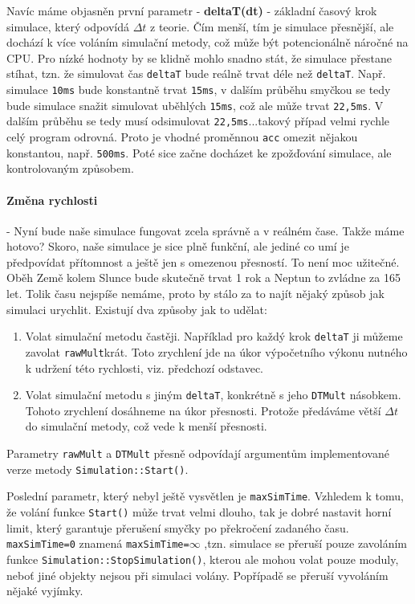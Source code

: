 \label{par:spiral}
Navíc máme objasněn první parametr - \textbf{deltaT(dt)} - základní časový krok simulace, který odpovídá $ \Delta t $ z teorie. Čím menší, tím je simulace přesnější, ale dochází k více voláním simulační metody, což může být potencionálně náročné na CPU.
Pro nízké hodnoty by se klidně mohlo snadno stát, že simulace přestane stíhat, tzn. že simulovat čas \texttt{deltaT} bude reálně trvat déle než \texttt{deltaT}. Např.
simulace \texttt{10ms} bude konstantně trvat \texttt{15ms}, v dalším průběhu smyčkou se tedy bude simulace snažit simulovat uběhlých \texttt{15ms}, což ale může trvat \texttt{22,5ms}. V dalším průběhu se tedy musí odsimulovat \texttt{22,5ms}...takový případ velmi rychle celý program odrovná. Proto je vhodné proměnnou \texttt{acc} omezit nějakou konstantou, např. \texttt{500ms}. Poté sice začne docházet ke zpožďování simulace, ale kontrolovaným způsobem.
\paragraph{Změna rychlosti} - Nyní bude naše simulace fungovat zcela správně a v reálném čase. Takže máme hotovo? Skoro, naše simulace je sice plně funkční, ale jediné co umí je předpovídat přítomnost a ještě jen s omezenou přesností. To není moc užitečné. Oběh Země kolem Slunce bude skutečně trvat 1 rok a Neptun to zvládne za 165 let. Tolik času nejspíše nemáme, proto by stálo za to najít nějaký způsob jak simulaci urychlit. Existují dva způsoby jak to udělat:
\begin{enumerate}
	\item Volat simulační metodu častěji. Například pro každý krok \texttt{deltaT} ji můžeme zavolat \texttt{rawMult}krát. Toto zrychlení jde na úkor výpočetního výkonu nutného k udržení této rychlosti, viz. předchozí odstavec.
	\item Volat simulační metodu s jiným \texttt{deltaT}, konkrétně s jeho \texttt{DTMult} násobkem. Tohoto zrychlení dosáhneme na úkor přesnosti. Protože předáváme větší $ \Delta t $ do simulační metody, což vede k menší přesnosti.
\end{enumerate}
Parametry \texttt{rawMult} a \texttt{DTMult} přesně odpovídají argumentům implementované verze metody \texttt{Simulation::Start()}.

Poslední parametr, který nebyl ještě vysvětlen je \texttt{maxSimTime}. Vzhledem k tomu, že volání funkce \texttt{Start()} může trvat velmi dlouho, tak je dobré nastavit horní limit, který garantuje přerušení smyčky po překročení zadaného času. \texttt{maxSimTime=0} znamená \texttt{maxSimTime=$ \infty $} ,tzn. simulace se přeruší pouze zavoláním funkce \texttt{Simulation::StopSimulation()}, kterou ale mohou volat pouze moduly, neboť jiné objekty nejsou při simulaci volány.
Popřípadě se přeruší vyvoláním nějaké vyjímky.


